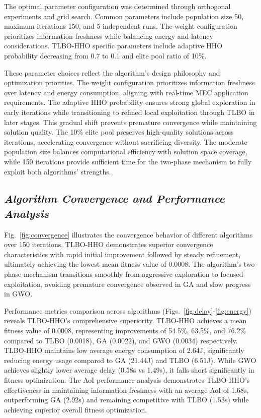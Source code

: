\documentclass[conference]{IEEEtran}
\begin{document}
The optimal parameter configuration was determined through orthogonal experiments and grid search. Common parameters include population size 50, maximum iterations 150, and 5 independent runs. The weight configuration prioritizes information freshness while balancing energy and latency considerations. TLBO-HHO specific parameters include adaptive HHO probability decreasing from 0.7 to 0.1 and elite pool ratio of 10\%.

These parameter choices reflect the algorithm's design philosophy and optimization priorities. The weight configuration prioritizes information freshness over latency and energy consumption, aligning with real-time MEC application requirements. The adaptive HHO probability ensures strong global exploration in early iterations while transitioning to refined local exploitation through TLBO in later stages. This gradual shift prevents premature convergence while maintaining solution quality. The 10\% elite pool preserves high-quality solutions across iterations, accelerating convergence without sacrificing diversity. The moderate population size balances computational efficiency with solution space coverage, while 150 iterations provide sufficient time for the two-phase mechanism to fully exploit both algorithms' strengths.

\subsection{\textit{Algorithm Convergence and Performance Analysis}}

Fig.~\ref{fig:convergence} illustrates the convergence behavior of different algorithms over 150 iterations. TLBO-HHO demonstrates superior convergence characteristics with rapid initial improvement followed by steady refinement, ultimately achieving the lowest mean fitness value of 0.0008. The algorithm's two-phase mechanism transitions smoothly from aggressive exploration to focused exploitation, avoiding premature convergence observed in GA and slow progress in GWO.

Performance metrics comparison across algorithms (Figs.~\ref{fig:delay}-\ref{fig:energy}) reveals TLBO-HHO's comprehensive superiority. TLBO-HHO achieves a mean fitness value of 0.0008, representing improvements of 54.5\%, 63.5\%, and 76.2\% compared to TLBO (0.0018), GA (0.0022), and GWO (0.0034) respectively. TLBO-HHO maintains low average energy consumption of 2.64J, significantly reducing energy usage compared to GA (21.44J) and TLBO (6.51J). While GWO achieves slightly lower average delay (0.58s vs 1.49s), it falls short significantly in fitness optimization. The AoI performance analysis demonstrates TLBO-HHO's effectiveness in maintaining information freshness with an average AoI of 1.68s, outperforming GA (2.92s) and remaining competitive with TLBO (1.53s) while achieving superior overall fitness optimization.
\end{document}
